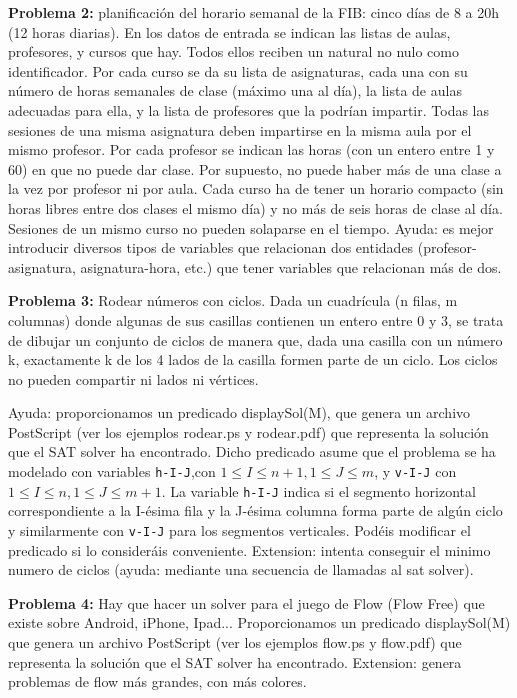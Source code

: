 \documentclass[11pt]{article}
\begin{document}
\textbf{Problema 2:} planificación del horario semanal de la FIB: cinco días de 8 a 20h (12 horas diarias).
En los datos de entrada se indican las listas de aulas, profesores, y cursos que hay. Todos ellos
reciben un natural no nulo como identificador. Por cada curso se da su lista de asignaturas, cada
una con su número de horas semanales de clase (máximo una al día), la lista de aulas adecuadas para
ella, y la lista de profesores que la podrían impartir. Todas las sesiones de una misma asignatura
deben impartirse en la misma aula por el mismo profesor. Por cada profesor se indican las horas
(con un entero entre 1 y 60) en que no puede dar clase. Por supuesto, no puede haber más de una
clase a la vez por profesor ni por aula. Cada curso ha de tener un horario compacto (sin horas
libres entre dos clases el mismo día) y no más de seis horas de clase al día. Sesiones de un mismo
curso no pueden solaparse en el tiempo. Ayuda: es mejor introducir diversos tipos de variables que relacionan
dos entidades (profesor-asignatura, asignatura-hora, etc.) que tener variables que relacionan más de dos.
\medskip

\textbf{Problema 3:} Rodear números con ciclos. Dada un cuadrícula (n filas, m columnas) donde algunas
de sus casillas contienen un entero entre 0 y 3, se trata de dibujar un conjunto de ciclos de manera
que, dada una casilla con un número k, exactamente k de los 4 lados de la casilla formen parte de
un ciclo. Los ciclos no pueden compartir ni lados ni vértices.

Ayuda: proporcionamos un predicado displaySol(M), que genera un archivo PostScript (ver los ejemplos rodear.ps y rodear.pdf) que
representa la solución que el SAT solver ha encontrado. Dicho predicado asume que el problema
se ha modelado con variables \texttt{h-I-J},con $1 \leq I \leq n + 1, 1 \leq J \leq m$, y \texttt{v-I-J} con $1 \leq I \leq n,
1 \leq J \leq m+1$. La variable \texttt{h-I-J} indica si el segmento horizontal correspondiente a la I-ésima fila
y la J-ésima columna forma parte de algún ciclo y similarmente con \texttt{v-I-J} para los segmentos
verticales. Podéis modificar el predicado si lo consideráis conveniente.
Extension: intenta conseguir el minimo numero de ciclos (ayuda: mediante una secuencia de llamadas al sat solver).
\medskip


\textbf{Problema 4:} Hay que hacer un solver para el juego de Flow (Flow Free) que existe sobre Android,
iPhone, Ipad... Proporcionamos un predicado displaySol(M) que genera un archivo PostScript (ver los ejemplos flow.ps y flow.pdf) que
representa la solución que el SAT solver ha encontrado. Extension: genera problemas de flow más grandes, con más colores.
\end{document}
